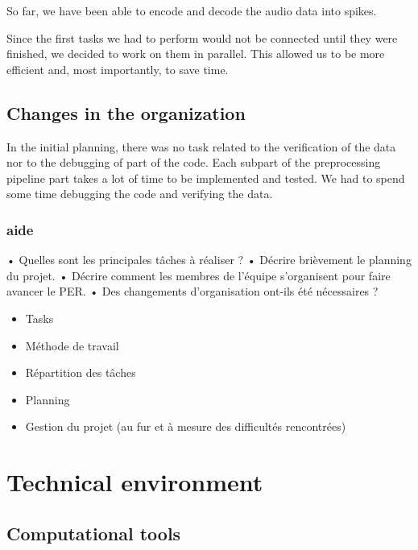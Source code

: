 \documentclass[11pt]{article}
\begin{document}
So far, we have been able to encode and decode the audio data into spikes.


Since the first tasks we had to perform would not be connected until they were finished, we decided to work on them in parallel. This allowed us to be more efficient and, most importantly, to save time.

\subsection{Changes in the organization}

In the initial planning, there was no task related to the verification of the data nor to the debugging of part of the code. Each subpart of the preprocessing pipeline part takes a lot of time to be implemented and tested. We had to spend some time debugging the code and verifying the data.



\subsubsection*{aide}

•	Quelles sont les principales tâches à réaliser ?
•	Décrire brièvement le planning du projet.
•	Décrire comment les membres de l’équipe s’organisent pour faire avancer le PER.
•	Des changements d’organisation ont-ils été nécessaires ?


\begin{itemize}
  \item Tasks
  \item Méthode de travail
  \item Répartition des tâches
  \item Planning
  \item Gestion du projet (au fur et à mesure des difficultés rencontrées)
\end{itemize}

\pagebreak

\section{Technical environment}

\subsection{Computational tools}
\end{document}
